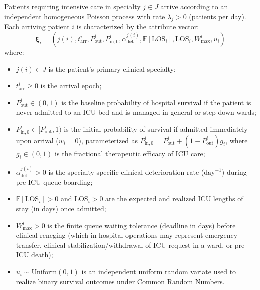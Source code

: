 \documentclass[final,5p,times,twocolumn]{elsarticle}
\begin{document}
Patients requiring intensive care in specialty $j \in J$ arrive according to an independent homogeneous Poisson process with rate $\lambda_j > 0$ (patients per day). Each arriving patient $i$ is characterized by the attribute vector:
\begin{equation}
    \boldsymbol{\xi}_i = \left( j(i), t_{\text{arr}}^i, P_{\text{out}}^i, P_{\text{in},0}^i, \alpha_{\text{det}}^{j(i)}, \mathbb{E}[\text{LOS}_i], \text{LOS}_i, W_{\max}^i, u_i \right)
    \label{eq:patient_tuple}
\end{equation}
where:
\begin{itemize}
    \item $j(i) \in J$ is the patient's primary clinical specialty;
    \item $t_{\text{arr}}^i \ge 0$ is the arrival epoch;
    \item $P_{\text{out}}^i \in (0, 1)$ is the baseline probability of hospital survival if the patient is never admitted to an ICU bed and is managed in general or step-down wards;
    \item $P_{\text{in},0}^i \in [P_{\text{out}}^i, 1)$ is the initial probability of survival if admitted immediately upon arrival ($w_i = 0$), parameterized as $P_{\text{in},0}^i = P_{\text{out}}^i + (1 - P_{\text{out}}^i) g_i$, where $g_i \in (0, 1)$ is the fractional therapeutic efficacy of ICU care;
    \item $\alpha_{\text{det}}^{j(i)} > 0$ is the specialty-specific clinical deterioration rate ($\text{day}^{-1}$) during pre-ICU queue boarding;
    \item $\mathbb{E}[\text{LOS}_i] > 0$ and $\text{LOS}_i > 0$ are the expected and realized ICU lengths of stay (in days) once admitted;
    \item $W_{\max}^i > 0$ is the finite queue waiting tolerance (deadline in days) before clinical reneging (which in hospital operations may represent emergency transfer, clinical stabilization/withdrawal of ICU request in a ward, or pre-ICU death);
    \item $u_i \sim \text{Uniform}(0, 1)$ is an independent uniform random variate used to realize binary survival outcomes under Common Random Numbers.
\end{itemize}
\end{document}
